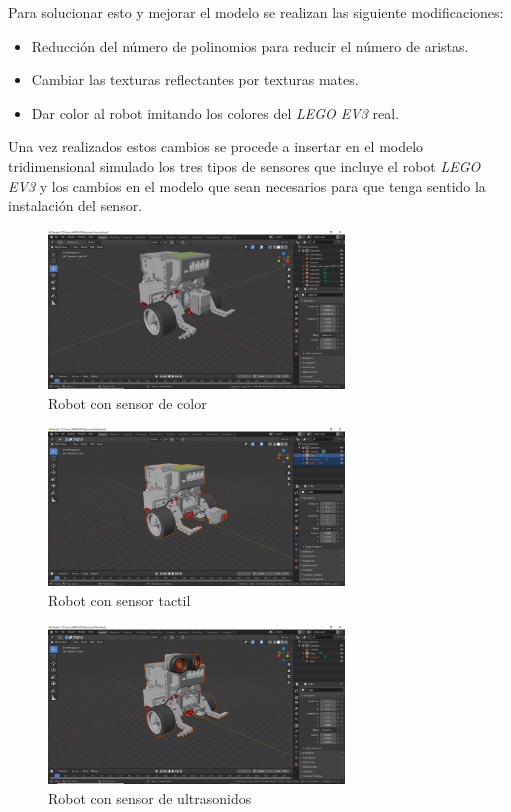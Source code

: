 Para solucionar esto y mejorar el modelo se realizan las siguiente modificaciones:


\begin{itemize}
\item Reducción del número de polinomios para reducir el número de aristas.
\item Cambiar las texturas reflectantes por texturas mates.
\item Dar color al robot imitando los colores del \textit{LEGO EV3} real. 
\end{itemize}


Una vez realizados estos cambios se procede a insertar en el modelo tridimensional simulado los tres tipos de sensores que incluye el robot \textit{LEGO EV3} y los cambios en el modelo que sean necesarios para que tenga sentido la instalación del sensor.
\\

  \begin{figure}[H]
    \centering
    \includegraphics[width=0.7\textwidth]{img/blendercolor.jpg}
    \caption{Robot con sensor de color} \label{fig:color}
\end{figure}
 \begin{figure}[H]
    \centering
    \includegraphics[width=0.7\textwidth]{img/blendertouch.jpg}
    \caption{Robot con sensor tactil} \label{fig:tactil}
\end{figure}
 \begin{figure}[H]
    \centering
    \includegraphics[width=0.7\textwidth]{img/blenderus.jpg}
    \caption{Robot con sensor de ultrasonidos} \label{fig:ultrasonidos}
\end{figure}


